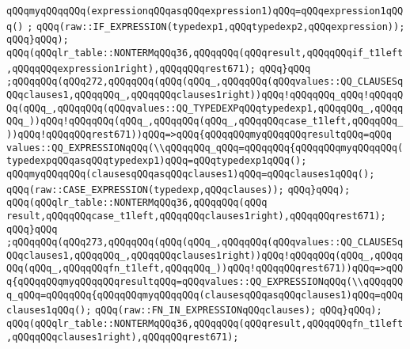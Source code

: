 \verb|qQQqmyqQQqqQQq(expressionqQQqasqQQqexpression1)qQQq=qQQqexpression1qQQq()|\newline
\verb|;|\newline
\verb|qQQq(raw::IF_EXPRESSION(typedexp1,qQQqtypedexp2,qQQqexpression));|\newline
\verb|qQQq}qQQq);|\newline
\verb|qQQq(qQQqlr_table::NONTERMqQQq36,qQQqqQQq(qQQqresult,qQQqqQQqif_t1left,qQQqqQQqexpression1right),qQQqqQQqrest671);|\newline
\verb|qQQq}qQQq|\newline
\verb|;qQQqqQQq(qQQq272,qQQqqQQq(qQQq(qQQq_,qQQqqQQq(qQQqvalues::QQ_CLAUSESqQQqclauses1,qQQqqQQq_,qQQqqQQqclauses1right))qQQq!qQQqqQQq_qQQq!qQQqqQQq(qQQq_,qQQqqQQq(qQQqvalues::QQ_TYPEDEXPqQQqtypedexp1,qQQqqQQq_,qQQqqQQq_))qQQq!qQQqqQQq(qQQq_,qQQqqQQq(qQQq_,qQQqqQQqcase_t1left,qQQqqQQq_))qQQq!qQQqqQQqrest671))qQQq=>qQQq{qQQqqQQqmyqQQqqQQqresultqQQq=qQQq|\newline
\verb|values::QQ_EXPRESSIONqQQq(\\qQQqqQQq_qQQq=qQQqqQQq{qQQqqQQqmyqQQqqQQq(typedexpqQQqasqQQqtypedexp1)qQQq=qQQqtypedexp1qQQq();|\newline
\verb|qQQqmyqQQqqQQq(clausesqQQqasqQQqclauses1)qQQq=qQQqclauses1qQQq();|\newline
\verb|qQQq(raw::CASE_EXPRESSION(typedexp,qQQqclauses));|\newline
\verb|qQQq}qQQq);|\newline
\verb|qQQq(qQQqlr_table::NONTERMqQQq36,qQQqqQQq(qQQq|\newline
\verb|result,qQQqqQQqcase_t1left,qQQqqQQqclauses1right),qQQqqQQqrest671);|\newline
\verb|qQQq}qQQq|\newline
\verb|;qQQqqQQq(qQQq273,qQQqqQQq(qQQq(qQQq_,qQQqqQQq(qQQqvalues::QQ_CLAUSESqQQqclauses1,qQQqqQQq_,qQQqqQQqclauses1right))qQQq!qQQqqQQq(qQQq_,qQQqqQQq(qQQq_,qQQqqQQqfn_t1left,qQQqqQQq_))qQQq!qQQqqQQqrest671))qQQq=>qQQq{qQQqqQQqmyqQQqqQQqresultqQQq=qQQqvalues::QQ_EXPRESSIONqQQq(\\qQQqqQQq_qQQq=qQQqqQQq{qQQqqQQqmyqQQqqQQq(clausesqQQqasqQQqclauses1)qQQq=qQQq|\newline
\verb|clauses1qQQq();|\newline
\verb|qQQq(raw::FN_IN_EXPRESSIONqQQqclauses);|\newline
\verb|qQQq}qQQq);|\newline
\verb|qQQq(qQQqlr_table::NONTERMqQQq36,qQQqqQQq(qQQqresult,qQQqqQQqfn_t1left,qQQqqQQqclauses1right),qQQqqQQqrest671);|\newline
